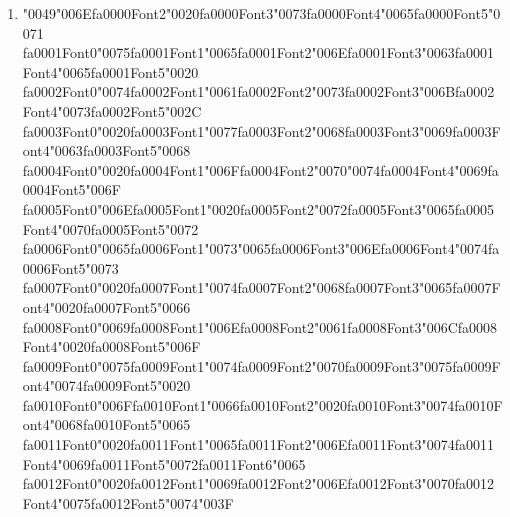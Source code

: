\documentclass[11pt]{article}
\begin{document}
\begin{enumerate}[label=Q\arabic*., leftmargin=*]
\item {\char"0049}{\char"006E}{\csname fa0000Font2\endcsname\char"0020}{\csname fa0000Font3\endcsname\char"0073}{\csname fa0000Font4\endcsname\char"0065}{\csname fa0000Font5\endcsname\char"0071} {\csname fa0001Font0\endcsname\char"0075}{\csname fa0001Font1\endcsname\char"0065}{\csname fa0001Font2\endcsname\char"006E}{\csname fa0001Font3\endcsname\char"0063}{\csname fa0001Font4\endcsname\char"0065}{\csname fa0001Font5\endcsname\char"0020} {\csname fa0002Font0\endcsname\char"0074}{\csname fa0002Font1\endcsname\char"0061}{\csname fa0002Font2\endcsname\char"0073}{\csname fa0002Font3\endcsname\char"006B}{\csname fa0002Font4\endcsname\char"0073}{\csname fa0002Font5\endcsname\char"002C} {\csname fa0003Font0\endcsname\char"0020}{\csname fa0003Font1\endcsname\char"0077}{\csname fa0003Font2\endcsname\char"0068}{\csname fa0003Font3\endcsname\char"0069}{\csname fa0003Font4\endcsname\char"0063}{\csname fa0003Font5\endcsname\char"0068} {\csname fa0004Font0\endcsname\char"0020}{\csname fa0004Font1\endcsname\char"006F}{\csname fa0004Font2\endcsname\char"0070}{\char"0074}{\csname fa0004Font4\endcsname\char"0069}{\csname fa0004Font5\endcsname\char"006F} {\csname fa0005Font0\endcsname\char"006E}{\csname fa0005Font1\endcsname\char"0020}{\csname fa0005Font2\endcsname\char"0072}{\csname fa0005Font3\endcsname\char"0065}{\csname fa0005Font4\endcsname\char"0070}{\csname fa0005Font5\endcsname\char"0072} {\csname fa0006Font0\endcsname\char"0065}{\csname fa0006Font1\endcsname\char"0073}{\char"0065}{\csname fa0006Font3\endcsname\char"006E}{\csname fa0006Font4\endcsname\char"0074}{\csname fa0006Font5\endcsname\char"0073} {\csname fa0007Font0\endcsname\char"0020}{\csname fa0007Font1\endcsname\char"0074}{\csname fa0007Font2\endcsname\char"0068}{\csname fa0007Font3\endcsname\char"0065}{\csname fa0007Font4\endcsname\char"0020}{\csname fa0007Font5\endcsname\char"0066} {\csname fa0008Font0\endcsname\char"0069}{\csname fa0008Font1\endcsname\char"006E}{\csname fa0008Font2\endcsname\char"0061}{\csname fa0008Font3\endcsname\char"006C}{\csname fa0008Font4\endcsname\char"0020}{\csname fa0008Font5\endcsname\char"006F} {\csname fa0009Font0\endcsname\char"0075}{\csname fa0009Font1\endcsname\char"0074}{\csname fa0009Font2\endcsname\char"0070}{\csname fa0009Font3\endcsname\char"0075}{\csname fa0009Font4\endcsname\char"0074}{\csname fa0009Font5\endcsname\char"0020} {\csname fa0010Font0\endcsname\char"006F}{\csname fa0010Font1\endcsname\char"0066}{\csname fa0010Font2\endcsname\char"0020}{\csname fa0010Font3\endcsname\char"0074}{\csname fa0010Font4\endcsname\char"0068}{\csname fa0010Font5\endcsname\char"0065} {\csname fa0011Font0\endcsname\char"0020}{\csname fa0011Font1\endcsname\char"0065}{\csname fa0011Font2\endcsname\char"006E}{\csname fa0011Font3\endcsname\char"0074}{\csname fa0011Font4\endcsname\char"0069}{\csname fa0011Font5\endcsname\char"0072}{\csname fa0011Font6\endcsname\char"0065} {\csname fa0012Font0\endcsname\char"0020}{\csname fa0012Font1\endcsname\char"0069}{\csname fa0012Font2\endcsname\char"006E}{\csname fa0012Font3\endcsname\char"0070}{\csname fa0012Font4\endcsname\char"0075}{\csname fa0012Font5\endcsname\char"0074}{\char"003F}


\end{enumerate}
\end{document}
